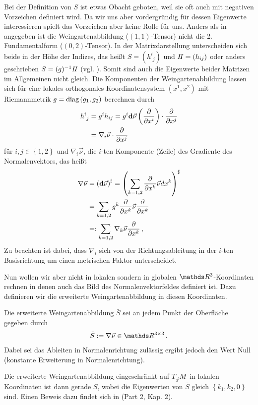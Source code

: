   Bei der Definition von \( S \) ist etwas Obacht geboten, weil sie oft auch mit negativen Vorzeichen definiert wird.
  Da wir uns aber vordergründig für dessen Eigenwerte interessieren spielt das Vorzeichen aber keine Rolle für uns.
  Anders als in \cite{heine} angegeben ist die Weingartenabbildung (\( (1,1) \)-Tensor) nicht die 2. Fundamentalform
  (\( (0,2) \)-Tensor). In der Matrixdarstellung unterscheiden sich beide in der Höhe der Indizes, das heißt
  \( S = \left(h^{i}_{\phantom{i}j}\right)\) und \( I \! I = \left( h_{ij} \right) \) oder anders geschrieben   \( S = (g)^{-1} I \! I \)
  (vgl. \cite{FirstCourse}).
  Somit sind auch die Eigenwerte beider Matrizen im Allgemeinen nicht gleich.
  Die Komponenten der Weingartenabbildung lassen sich für eine lokales orthogonales Koordinatensystem \( \left( x^{1},x^{2} \right) \)
  mit Riemannmetrik \( g=\text{diag}\left( g_{1},g_{2} \right) \) berechnen durch
  \begin{align}
    h^{i}_{\phantom{i}j} &=  g^{i}h_{ij} = g^{i} \mathbf{d}\vec{\nu}\left(\frac{\partial}{\partial x^{i}}\right) 
                                                  \cdot \frac{\partial}{\partial x^{j}} \\
                          &= \nabla_{i} \vec{\nu} \cdot \frac{\partial}{\partial x^{j}}
  \end{align}
  für \( i,j\in\left\{ 1,2 \right\} \) und \( \nabla_{i} \vec{\nu} \), die \( i \)-ten Komponente (Zeile) des Gradiente des
  Normalenvektors,
  das heißt
  \begin{align}
    \nabla\vec{\nu} &= \left( \mathbf{d} \vec{\nu}\right)^{\sharp}
                     = \left( \sum_{k=1,2} \frac{\partial}{\partial x^{k}} \vec{\nu} dx^{k} \right)^{\sharp} \\
                    &= \sum_{k=1,2} g^{k}\frac{\partial}{\partial x^{k}} \vec{\nu}\frac{\partial}{\partial x^{k}}  \\
                    &=: \sum_{k=1,2} \nabla_{k}\vec{\nu}\frac{\partial}{\partial x^{k}} \,\text{,}
  \end{align}
  Zu beachten ist dabei, dass \( \nabla_{i} \) sich von der Richtungsableitung in der \( i \)-ten Basisrichtung um einen metrischen Faktor
  unterscheidet.

  Nun wollen wir aber nicht in lokalen sondern in globalen \( \R^{3} \)-Koordinaten rechnen in denen auch das Bild des Normalenvektorfeldes
  definiert ist. 
  Dazu definieren wir die erweiterte Weingartenabbildung in diesen Koordinaten.
  \begin{definition}
    Die erweiterte Weingartenabbildung \( \bar{S} \) sei an jedem Punkt der Oberfläche gegeben durch
    \begin{align}
      \bar{S}:= \nabla\vec{\nu} \in \R^{3 \times 3} \formpunkt
    \end{align}
    Dabei sei das Ableiten in Normalenrichtung zulässig ergibt jedoch den Wert Null (konstante Erweiterung in Normalenrichtung).
  \end{definition}
  Die erweiterte Weingartenabbildung eingeschränkt auf \( T_{\vec{x}}M \)\ in lokalen Koordinaten ist dann gerade \( S \),
  wobei die Eigenwerten von \( \bar{S} \) gleich \( \left\{ k_{1},k_{2},0 \right\} \) sind.
  Einen Beweis dazu findet sich in \cite{kimura} (Part 2, Kap. 2).
  
